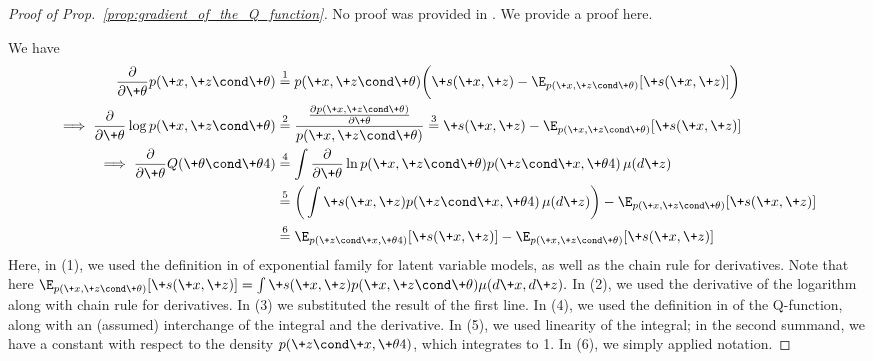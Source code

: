 \documentclass{article} %
\newcommand{\sufficientStatsFunction}{\+s}
\newcommand{\param}{\+\theta}
\begin{document}
 
\begin{proof}[Proof of Prop.~\ref{prop:gradient_of_the_Q_function}] No proof was provided in \citet{salakhutdinov2002relationship}. We provide a proof here.

We have 
\begin{align*}
\frac{\partial}{\partial \param}  p(\+x, \+z \cond \param) & \stackrel{1}{=} p(\+x, \+z \cond \param) \bigg( \sufficientStatsFunction(\+x, \+z) - \E
_{p(\+x,\+z \cond \param)} [\sufficientStatsFunction(\+x, \+z)] \bigg) \\
\implies \frac{\partial}{\partial \param}  \log p(\+x, \+z \cond \param) & \stackrel{2}{=} \frac{\frac{\partial p(\+x, \+z \cond \param)}{\partial \param}}{p(\+x, \+z \cond \param)} \stackrel{3}{=}  \sufficientStatsFunction(\+x, \+z) - \E
_{p(\+x,\+z \cond \param)} [\sufficientStatsFunction(\+x, \+z)] \\
\implies \frac{\partial}{\partial \param}  Q(\param \cond \param^^t) & \stackrel{4}{=} \int \frac{\partial}{\partial \param} \ln p(
\+x ,\+z \cond \param) p(\+z \cond \+x, \param^^t) \, \mu(d\+z) \\
& \stackrel{5}{=} \bigg( \int \sufficientStatsFunction(\+x, \+z) p(\+z \cond \+x, \param^^t) \, \mu(d\+z)\bigg) - \E
_{p(\+x,\+z \cond \param)} [\sufficientStatsFunction(\+x, \+z)]  \\
& \stackrel{6}{=} \E
_{p(\+z \cond \+x, \param^^t)} [\sufficientStatsFunction(\+x, \+z)]   - \E
_{p(\+x,\+z \cond \param)} [\sufficientStatsFunction(\+x, \+z)] 
\end{align*}
%
Here, in (1), we used the definition in  of exponential family for latent variable models, as well as the chain rule for derivatives.   Note that here $\E
_{p(\+x,\+z \cond \param)} [\sufficientStatsFunction(\+x, \+z)] =  \int \sufficientStatsFunction(\+x, \+z) p(\+x,\+z \cond \param) \mu(d\+x, d\+z).$ In (2), we used the derivative of the logarithm along with chain rule for derivatives. In (3) we substituted the result of the first line. In (4), we used the definition in 
of the Q-function, along with an (assumed) interchange of the integral and the derivative. In (5), we used linearity of the integral; in the second summand, we have a constant with respect to the density $p(\+z \cond \+x, \param^^t)$, which integrates to 1.  In (6), we simply applied notation.  
\end{proof}
\end{document}

